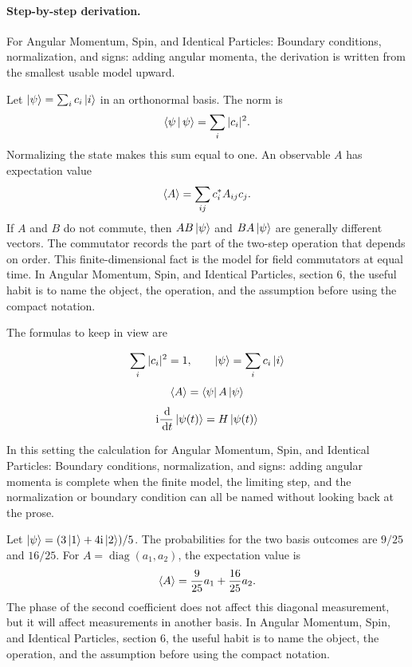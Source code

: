 \paragraph{Step-by-step derivation.}

For Angular Momentum, Spin, and Identical Particles: Boundary conditions, normalization, and signs: adding angular momenta, the derivation is written from the smallest usable model upward.

Let \(\left|\psi\right\rangle=\sum_i c_i\left|i\right\rangle\) in an orthonormal basis.  The norm is
\[
  \left\langle \psi\,\middle|\,\psi\right\rangle=\sum_i |c_i|^2.
\]
Normalizing the state makes this sum equal to one.  An observable \(A\) has expectation value
\[
  \left\langle A\right\rangle=\sum_{ij}c_i^*A_{ij}c_j.
\]
If \(A\) and \(B\) do not commute, then \(AB\left|\psi\right\rangle\) and \(BA\left|\psi\right\rangle\) are generally different vectors.  The commutator records the part of the two-step operation that depends on order.  This finite-dimensional fact is the model for field commutators at equal time.  In Angular Momentum, Spin, and Identical Particles, section 6, the useful habit is to name the object, the operation, and the assumption before using the compact notation.

The formulas to keep in view are

\[
  \sum_i |c_i|^2=1,\qquad \left|\psi\right\rangle=\sum_i c_i\left|i\right\rangle
\]
\[
  \left\langle A\right\rangle=\left\langle \psi\right|A\left|\psi\right\rangle
\]
\[
  \mathrm i\frac{\,\mathrm d}{\,\mathrm d t}\left|\psi(t)\right\rangle=H\left|\psi(t)\right\rangle
\]

In this setting the calculation for Angular Momentum, Spin, and Identical Particles: Boundary conditions, normalization, and signs: adding angular momenta is complete when the finite model, the limiting step, and the normalization or boundary condition can all be named without looking back at the prose.




\begin{example}
Let \(\left|\psi\right\rangle=(3\left|1\right\rangle+4\mathrm i\left|2\right\rangle)/5\).  The probabilities for the two basis outcomes are \(9/25\) and \(16/25\).  For \(A=\operatorname{diag}(a_1,a_2)\), the expectation value is
\[
  \left\langle A\right\rangle=\frac{9}{25}a_1+\frac{16}{25}a_2.
\]
The phase of the second coefficient does not affect this diagonal measurement, but it will affect measurements in another basis.  In Angular Momentum, Spin, and Identical Particles, section 6, the useful habit is to name the object, the operation, and the assumption before using the compact notation.
\end{example}



